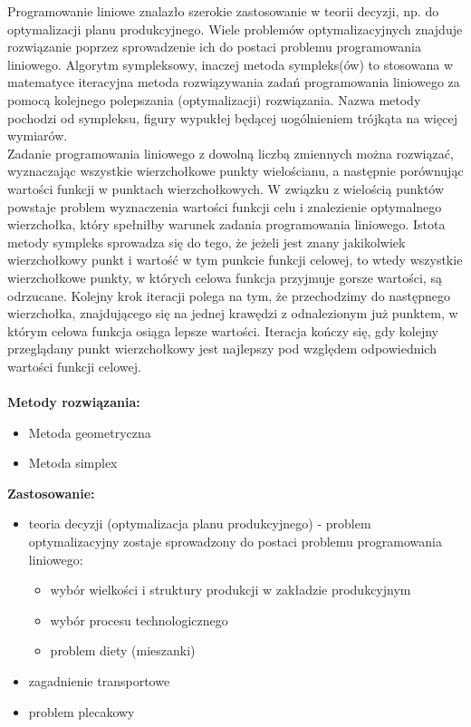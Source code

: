 \documentclass[10pt, a
4paper]{article}
\begin{document}
Programowanie liniowe znalazło szerokie zastosowanie w teorii decyzji, np. do optymalizacji planu produkcyjnego. Wiele problemów optymalizacyjnych znajduje rozwiązanie poprzez sprowadzenie ich do postaci problemu programowania liniowego.
Algorytm sympleksowy, inaczej metoda sympleks(ów) to stosowana w matematyce iteracyjna metoda rozwiązywania zadań programowania liniowego za pomocą kolejnego polepszania (optymalizacji) rozwiązania. Nazwa metody pochodzi od sympleksu, figury wypukłej będącej uogólnieniem trójkąta na więcej wymiarów.\\
\indent Zadanie programowania liniowego z dowolną liczbą zmiennych można rozwiązać, wyznaczając wszystkie wierzchołkowe punkty wielościanu, a następnie porównując wartości funkcji w punktach wierzchołkowych. W związku z wielością punktów powstaje problem wyznaczenia wartości funkcji celu i znalezienie optymalnego wierzchołka, który spełniłby warunek zadania programowania liniowego. Istota metody sympleks sprowadza się do tego, że jeżeli jest znany jakikolwiek wierzchołkowy punkt i wartość w tym punkcie funkcji celowej, to wtedy wszystkie wierzchołkowe punkty, w których celowa funkcja przyjmuje gorsze wartości, są odrzucane. Kolejny krok iteracji polega na tym, że przechodzimy do następnego wierzchołka, znajdującego się na jednej krawędzi z odnalezionym już punktem, w którym celowa funkcja osiąga lepsze wartości. Iteracja kończy się, gdy kolejny przeglądany punkt wierzchołkowy jest najlepszy pod względem odpowiednich wartości funkcji celowej.\\
\\
\textbf{Metody rozwiązania:}
\begin{itemize}
\item Metoda geometryczna
\item Metoda simplex
\end{itemize}
\textbf{Zastosowanie:}
\begin{itemize}
\item teoria decyzji (optymalizacja planu produkcyjnego) - problem optymalizacyjny zostaje sprowadzony do postaci problemu programowania liniowego:
\begin{itemize}
\item wybór wielkości i struktury produkcji w zakładzie produkcyjnym
\item wybór procesu technologicznego
\item problem diety (mieszanki)
\end{itemize}
\item zagadnienie transportowe
\item problem plecakowy
\end{itemize}
\end{document}
